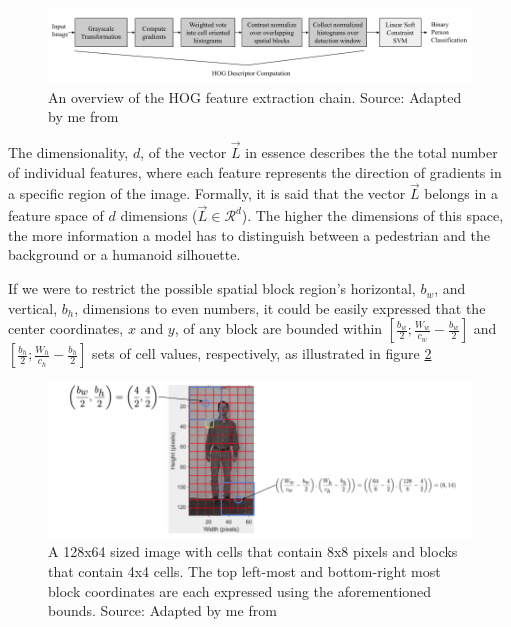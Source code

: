 \begin{figure}
    \centering
    \includegraphics[width=1\linewidth]{images/HOG Pipeline.png}
    \caption{An overview of the HOG feature extraction chain. Source: Adapted by me from \cite{dalal_2005_histograms}}
    \label{fig:hog_pipeline}
\end{figure}

The dimensionality, $d$, of the vector $\vec{L}$ in essence describes the the total number of individual features, where each feature represents the direction of gradients in a specific region of the image. Formally, it is said that the vector $\vec{L}$ belongs in a feature space of $d$ dimensions ($\vec{L} \in \mathcal{R}^{d}$). The higher the dimensions of this space, the more information a model has to distinguish between a pedestrian and the background or a humanoid silhouette. 

If we were to restrict the possible spatial block region's horizontal, $b_w$, and vertical, $b_h$, dimensions to even numbers, it could be easily expressed that the center coordinates, $x$ and $y$, of any block are bounded within $\left[ \frac{b_w}{2}; \frac{W_w}{c_w} - \frac{b_w}{2}\right]$ and $\left[ \frac{b_h}{2}; \frac{W_h}{c_h} - \frac{b_h}{2}\right]$ sets of cell values, respectively, as illustrated in figure \ref{fig:center_coords}

\begin{figure}
    \centering
    \includegraphics[width=1\linewidth]{images/Center Coordinates.png}
    \caption{A 128x64 sized image with cells that contain 8x8 pixels and blocks that contain 4x4 cells. The top left-most and bottom-right most block coordinates are each expressed using the aforementioned bounds. Source: Adapted by me from \cite{shidlovskiy_2020_reducing}}
    \label{fig:center_coords}
\end{figure}

